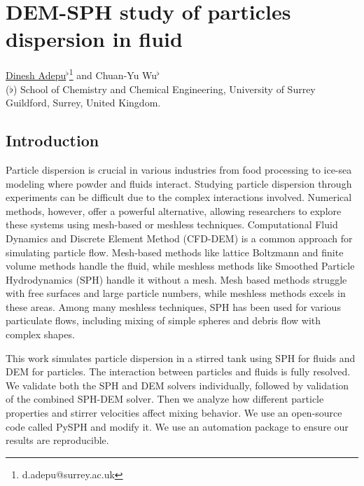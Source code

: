 \documentclass[a4paper,11pt]{book}
\begin{document}
\chapter{{DEM}-{SPH} study of particles dispersion in fluid}

\thispagestyle{empty}
\vspace{-0.5cm}
\begin{center}
\begin{large}
  \underline{Dinesh Adepu}$^\flat$\footnote{d.adepu@surrey.ac.uk}
  and Chuan-Yu Wu$^\flat$\\
  \vspace{0.25cm}
  \normalsize ($\flat$)\; School of Chemistry and Chemical Engineering, University of Surrey\\
  \normalsize  Guildford, Surrey, United Kingdom.\\
\end{large}
\end{center}
\vspace{-0.5cm}

\section{Introduction}

Particle dispersion is crucial in various industries from food processing to
ice-sea modeling where powder and fluids interact.  Studying particle dispersion
through experiments can be difficult due to the complex interactions involved.
Numerical methods, however, offer a powerful alternative, allowing researchers
to explore these systems using mesh-based or meshless techniques.  Computational
Fluid Dynamics and Discrete Element Method (CFD-DEM) is a common approach for
simulating particle flow.  Mesh-based methods like lattice Boltzmann and finite
volume methods handle the fluid, while meshless methods like Smoothed Particle
Hydrodynamics (SPH) handle it without a mesh. Mesh based methods struggle with
free surfaces and large particle numbers, while meshless methods excels in these
areas. Among many meshless techniques, SPH has been used for various particulate
flows, including mixing of simple spheres and debris flow with complex shapes.

This work simulates particle dispersion in a stirred tank using SPH for fluids
and DEM for particles.  The interaction between particles and fluids is fully
resolved.  We validate both the SPH and DEM solvers individually, followed by
validation of the combined SPH-DEM solver.  Then we analyze how different
particle properties and stirrer velocities affect mixing behavior. We use an
open-source code called PySPH and modify it. We use an automation package to
ensure our results are reproducible.
\end{document}
